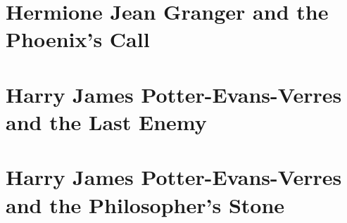 \part{Hermione Jean Granger and the Phoenix's Call}






















\part{Harry James Potter-Evans-Verres and the Last Enemy}














\part{Harry James Potter-Evans-Verres and the Philosopher's Stone}


























